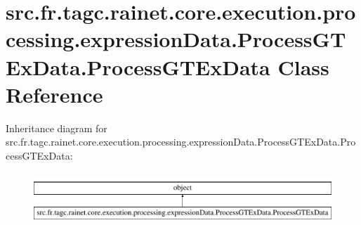 \hypertarget{classsrc_1_1fr_1_1tagc_1_1rainet_1_1core_1_1execution_1_1processing_1_1expressionData_1_1ProcessGTExData_1_1ProcessGTExData}{\section{src.\-fr.\-tagc.\-rainet.\-core.\-execution.\-processing.\-expression\-Data.\-Process\-G\-T\-Ex\-Data.\-Process\-G\-T\-Ex\-Data Class Reference}
\label{classsrc_1_1fr_1_1tagc_1_1rainet_1_1core_1_1execution_1_1processing_1_1expressionData_1_1ProcessGTExData_1_1ProcessGTExData}
}
Inheritance diagram for src.\-fr.\-tagc.\-rainet.\-core.\-execution.\-processing.\-expression\-Data.\-Process\-G\-T\-Ex\-Data.\-Process\-G\-T\-Ex\-Data\-:\begin{figure}[H]
\begin{center}
\leavevmode
\includegraphics[height=1.958042cm]{classsrc_1_1fr_1_1tagc_1_1rainet_1_1core_1_1execution_1_1processing_1_1expressionData_1_1ProcessGTExData_1_1ProcessGTExData}
\end{center}
\end{figure}
